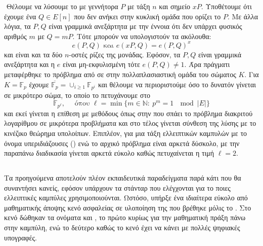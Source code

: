 \documentclass[oneside,a4paper]{article}
\begin{document}
$ $\newline
Θέλουμε να λύσουμε το  με γεννήτορα $P$ με τάξη $n$ και σημείο $xP$. Υποθέτουμε ότι έχουμε ένα $Q \in E[n]$ που δεν ανήκει στην κυκλική ομάδα που ορίζει το $P$. Με άλλα λόγια, τα $P,Q$ είναι γραμμικά ανεξάρτητα με την έννοια ότι δεν υπάρχει φυσικός αριθμός $m$ με $Q=mP$. Τότε μπορούν να υπολογιστούν τα ακόλουθα:
$$e(P,Q) \text{ και } e(xP,Q) = e(P,Q)^x $$ και είναι και τα δύο $n$-οστές ρίζες της μονάδας. Εφόσον, τα $P,Q$ είναι γραμμικά ανεξάρτητα και η $e$ είναι μη-εκφυλισμένη τότε $e(P,Q) \neq 1$. Άρα πράγματι μεταφέρθηκε το πρόβλημα από  σε  στην πολλαπλασιαστική ομάδα του σώματος $K$. Για $K=\mathbb{F}_p$ έχουμε $\overline{\mathbb{F}_p} = \cup_{i\geq 1}\mathbb{F}_{p^i}$ και θέλουμε να περιοριστούμε όσο το δυνατόν γίνεται σε μικρότερο σώμα, το οποίο το πετυχάνουμε στο
$$\mathbb{F}_{p^{\ell}}, \quad \text{ όπου } \ell = \min\{ m \in \mathbb{N}: \ p^m = 1  \ \mod |E|\}$$ και εκεί γίνεται η επίθεση με μεθόδους όπως στην  που σπάει το πρόβλημα διακριτού λογαρίθμου σε μικρότερα προβλήματα και στο τέλος γίνεται σύνθεση της λύσης με το κινέζικο θεώρημα υπολοίπων. Επιπλέον, για μια τάξη ελλειπτικών καμπυλών με το όνομα υπεριδιάζουσες () ενώ το αρχικό πρόβλημα  είναι αρκετά δύσκολο, με την παραπάνω διαδικασία γίνεται αρκετά εύκολο καθώς πετυχαίνεται η τιμή $\ell = 2$.




\subsection{}

\vspace*{0.3cm}
Τα προηγούμενα  αποτελούν πλέον εκπαιδευτικά παραδείγματα παρά κάτι που θα συναντήσει κανείς, εφόσον υπάρχουν τα στάνταρ που ελέγχονται για το ποιες ελλειπτικές καμπύλες χρησιμοποιούνται. Ωστόσο, υπήρξε ένα ιδιαίτερα εύκολο από μαθηματικής άποψης κενό ασφαλείας σε υλοποίηση της  που βρέθηκε μόλις το . Στο κενό δώθηκαν τα ονόματα  και , το πρώτο κυρίως για την μαθηματική πράξη πάνω στην καμπύλη, ενώ το δεύτερο καθώς το κενό έχει να κάνει με πολλές ψηφιακές υπογραφές.
\end{document}
